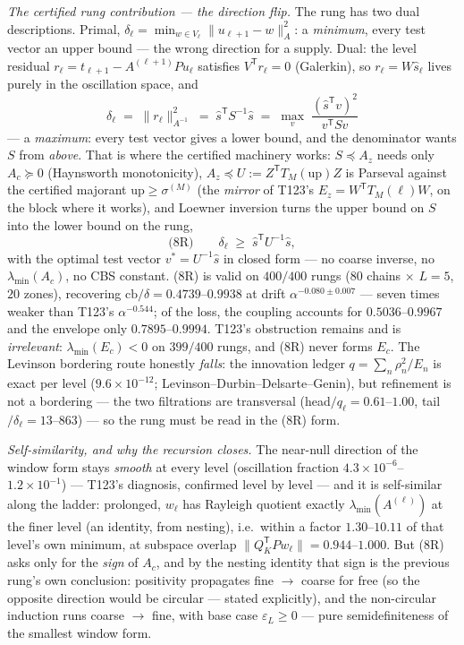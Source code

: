 \documentclass[11pt,a4paper]{article}
\begin{document}
\emph{The certified rung contribution --- the direction flip.} The rung has two dual
descriptions. Primal, $\delta_\ell=\min_{w\in V_\ell}\|u_{\ell+1}-w\|^2_A$: a
\emph{minimum}, every test vector an upper bound --- the wrong direction for a supply. Dual:
the level residual $r_\ell=t_{\ell+1}-A^{(\ell+1)}Pu_\ell$ satisfies
$V^{\mathsf T}r_\ell=0$ (Galerkin), so $r_\ell=W\hat s_\ell$ lives purely in the oscillation
space, and
\[
\delta_\ell\;=\;\|r_\ell\|^2_{A^{-1}}\;=\;\hat s^{\mathsf T}S^{-1}\hat s
\;=\;\max_v\;\frac{(\hat s^{\mathsf T}v)^2}{v^{\mathsf T}Sv}
\]
--- a \emph{maximum}: every test vector gives a lower bound, and the denominator wants $S$
from \emph{above}. That is where the certified machinery works: $S\preceq A_z$ needs only
$A_c\succeq0$ (Haynsworth monotonicity), $A_z\preceq U:=Z^{\mathsf T}T_M(\mathrm{up})Z$ is
Parseval against the certified majorant $\mathrm{up}\ge\sigma^{(M)}$ (the \emph{mirror} of
T123's $E_z=W^{\mathsf T}T_M(\ell)W$, on the block where it works), and Loewner inversion
turns the upper bound on $S$ into the lower bound on the rung,
\[
\text{(8R)}\qquad \delta_\ell\;\ge\;\hat s^{\mathsf T}U^{-1}\hat s,
\]
with the optimal test vector $v^*=U^{-1}\hat s$ in closed form --- no coarse inverse, no
$\lambda_{\min}(A_c)$, no CBS constant. (8R) is valid on $400/400$ rungs ($80$ chains
$\times$ $L=5$, $20$ zones), recovering $\mathrm{cb}/\delta=0.4739$--$0.9938$ at drift
$\alpha^{-0.080\pm0.007}$ --- seven times weaker than T123's $\alpha^{-0.544}$; of the loss,
the coupling accounts for $0.5036$--$0.9967$ and the envelope only $0.7895$--$0.9994$.
T123's obstruction remains and is \emph{irrelevant}: $\lambda_{\min}(E_c)<0$ on $399/400$
rungs, and (8R) never forms $E_c$. The Levinson bordering route honestly \emph{falls}: the
innovation ledger $q=\sum_n\rho_n^2/E_n$ is exact per level ($9.6\times10^{-12}$;
Levinson--Durbin--Delsarte--Genin), but refinement is not a bordering --- the two
filtrations are transversal (head$/q_\ell=0.61$--$1.00$, tail$/\delta_\ell=13$--$863$) ---
so the rung must be read in the (8R) form.

\emph{Self-similarity, and why the recursion closes.} The near-null direction of the window
form stays \emph{smooth} at every level (oscillation fraction
$4.3\times10^{-6}$--$1.2\times10^{-1}$) --- T123's diagnosis, confirmed level by level ---
and it is self-similar along the ladder: prolonged, $w_\ell$ has Rayleigh quotient exactly
$\lambda_{\min}(A^{(\ell)})$ at the finer level (an identity, from nesting), i.e.\ within a
factor $1.30$--$10.11$ of that level's own minimum, at subspace overlap
$\|Q_K^{\mathsf T}Pw_\ell\|=0.944$--$1.000$. But (8R) asks only for the \emph{sign} of
$A_c$, and by the nesting identity that sign is the previous rung's own conclusion:
positivity propagates fine $\to$ coarse for free (so the opposite direction would be
circular --- stated explicitly), and the non-circular induction runs coarse $\to$ fine, with
base case $\varepsilon_L\ge0$ --- pure semidefiniteness of the smallest window form.
\end{document}
